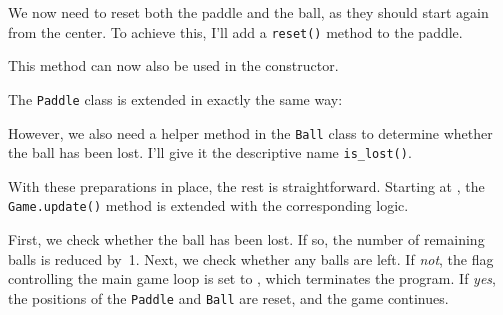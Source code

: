 We now need to reset both the paddle and the ball, as they should start again from the center. To achieve this, I'll add a \texttt{reset()} method to the paddle.


This method can now also be used in the constructor.


The \texttt{Paddle} class is extended in exactly the same way:



However, we also need a helper method in the \texttt{Ball} class to determine whether the ball has been lost. I'll give it the descriptive name \texttt{is\_lost()}.


\begin{figure}%
	\begin{center}%
		\vspace{-6ex}%
	\end{center}%
\end{figure}%
With these preparations in place, the rest is straightforward. Starting at , the \texttt{Game.update()} method is extended with the corresponding logic.

First, we check whether the ball has been lost. If so, the number of remaining balls is reduced by~1. Next, we check whether any balls are left. If \emph{not}, the flag controlling the main game loop is set to \false, which terminates the program. If \emph{yes}, the positions of the \texttt{Paddle} and \texttt{Ball} are reset, and the game continues.

